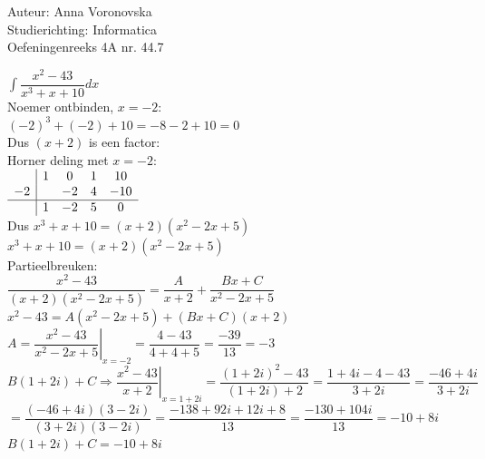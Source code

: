 \documentclass[a4paper]{article}
\begin{document}
  
\noindent \large Auteur: Anna Voronovska \\
\noindent \large Studierichting: Informatica\\
\noindent \large Oefeningenreeks 4A nr. 44.7\\

\medskip

\normalsize

$\displaystyle\int \dfrac{x^2-43}{x^3+x+10}dx$\\

Noemer ontbinden, $x=-2$:\\

$(-2)^3 + (-2) + 10 = -8 - 2 + 10 = 0$\\

Dus $(x+2)$ is een factor:\\

Horner deling met $x=-2$:\\

$\begin{array}{c|cccc}
   & 1 & 0  & 1 & 10 \\
-2 &   & -2 & 4 & -10 \\
\hline
   & 1 & -2 & 5 & 0
\end{array}$\\

Dus $x^3 + x + 10 = (x+2)(x^2-2x+5)$\\

$x^3 + x + 10 = (x+2)(x^2-2x+5)$\\

Partieelbreuken:\\

$\dfrac{x^2-43}{(x+2)(x^2-2x+5)} = \dfrac{A}{x+2} + \dfrac{Bx+C}{x^2-2x+5}$\\

$x^2-43 = A(x^2-2x+5) + (Bx+C)(x+2)$\\

$A = \left. \dfrac{x^2-43}{x^2-2x+5}\right|_{x=-2} = \dfrac{4-43}{4+4+5} = \dfrac{-39}{13} = -3$\\

$B(1+2i)+C \Rightarrow \left. \dfrac{x^2-43}{x+2}\right|_{x=1+2i} = \dfrac{(1+2i)^2-43}{(1+2i)+2} = \dfrac{1+4i-4-43}{3+2i} = \dfrac{-46+4i}{3+2i}$\\

$= \dfrac{(-46+4i)(3-2i)}{(3+2i)(3-2i)} = \dfrac{-138+92i+12i+8}{13} = \dfrac{-130+104i}{13} = -10+8i$\\

$B(1+2i)+C = -10+8i$\\
\end{document}
